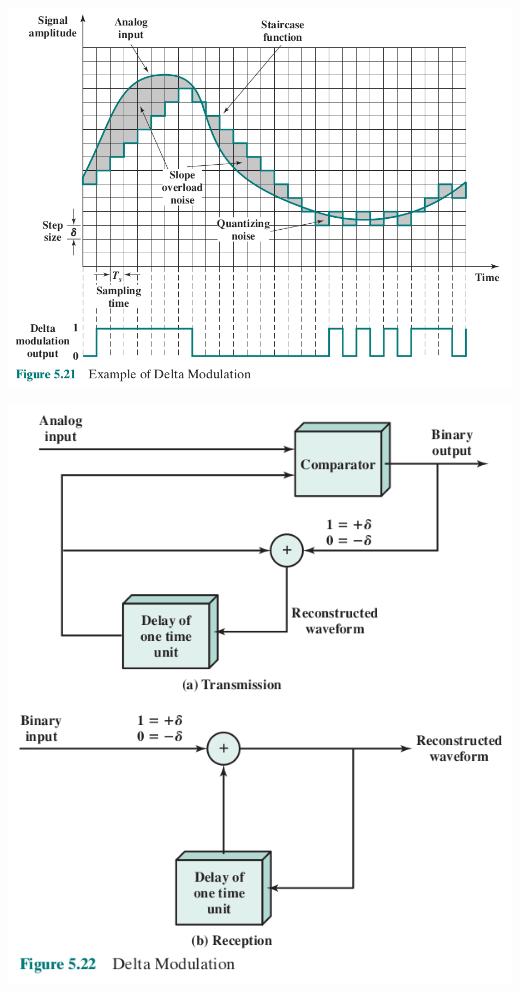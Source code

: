 \documentclass[pdflatex,compress]{beamer}
\begin{document}
\begin{frame}
	\begin{center}
		\includegraphics[width=0.9\linewidth]{img/img27}
	\end{center}
\end{frame}

\begin{frame}
	\begin{center}
		\includegraphics[width=0.6\linewidth]{img/img28}
	\end{center}
\end{frame}
\end{document}
